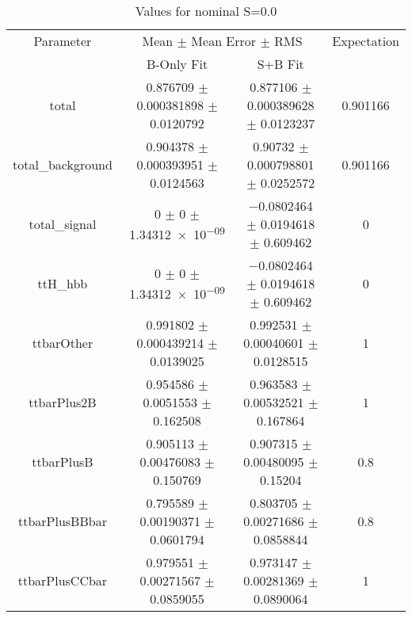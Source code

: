 \begin{table}
\centering
\caption{Values for nominal S=0.0}
\begin{tabular}{cccc}
\toprule
Parameter & \multicolumn{2}{c}{Mean $\pm$ Mean Error $\pm$ RMS} & Expectation\\
 & B-Only Fit & S+B Fit & \\
\midrule
total & \num{0.876709} $\pm$ \num{0.000381898} $\pm$ \num{0.0120792} & \num{0.877106} $\pm$ \num{0.000389628} $\pm$ \num{0.0123237} & \num{0.901166}\\
total\_background & \num{0.904378} $\pm$ \num{0.000393951} $\pm$ \num{0.0124563} & \num{0.90732} $\pm$ \num{0.000798801} $\pm$ \num{0.0252572} & \num{0.901166}\\
total\_signal & \num{0} $\pm$ \num{0} $\pm$ \num{1.34312e-09} & \num{-0.0802464} $\pm$ \num{0.0194618} $\pm$ \num{0.609462} & \num{0}\\
ttH\_hbb & \num{0} $\pm$ \num{0} $\pm$ \num{1.34312e-09} & \num{-0.0802464} $\pm$ \num{0.0194618} $\pm$ \num{0.609462} & \num{0}\\
ttbarOther & \num{0.991802} $\pm$ \num{0.000439214} $\pm$ \num{0.0139025} & \num{0.992531} $\pm$ \num{0.00040601} $\pm$ \num{0.0128515} & \num{1}\\
ttbarPlus2B & \num{0.954586} $\pm$ \num{0.0051553} $\pm$ \num{0.162508} & \num{0.963583} $\pm$ \num{0.00532521} $\pm$ \num{0.167864} & \num{1}\\
ttbarPlusB & \num{0.905113} $\pm$ \num{0.00476083} $\pm$ \num{0.150769} & \num{0.907315} $\pm$ \num{0.00480095} $\pm$ \num{0.15204} & \num{0.8}\\
ttbarPlusBBbar & \num{0.795589} $\pm$ \num{0.00190371} $\pm$ \num{0.0601794} & \num{0.803705} $\pm$ \num{0.00271686} $\pm$ \num{0.0858844} & \num{0.8}\\
ttbarPlusCCbar & \num{0.979551} $\pm$ \num{0.00271567} $\pm$ \num{0.0859055} & \num{0.973147} $\pm$ \num{0.00281369} $\pm$ \num{0.0890064} & \num{1}\\
\bottomrule
\end{tabular}
\end{table}